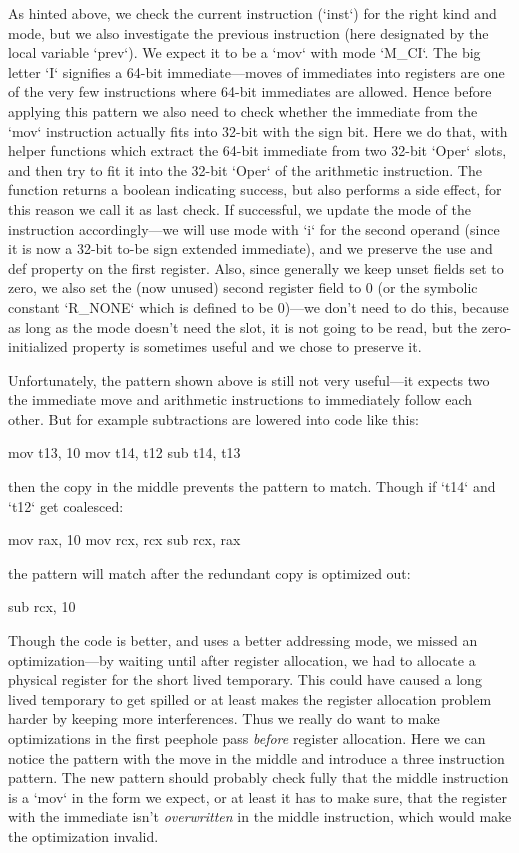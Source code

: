 As hinted above, we check the current instruction (`inst`) for the right kind
and mode, but we also investigate the previous instruction (here designated by
the local variable `prev`). We expect it to be a `mov` with mode `M_CI`.
The big letter `I` signifies a 64-bit
immediate---moves of immediates into registers are one of the very few
instructions where 64-bit immediates are allowed. Hence before applying this pattern
we also need to check whether the immediate from the `mov` instruction actually
fits into 32-bit with the sign bit. Here we do that, with helper functions which
extract the 64-bit immediate from two 32-bit `Oper` slots, and then try to fit
it into the 32-bit `Oper` of the arithmetic instruction. The function
returns a boolean indicating success, but also performs a side effect, for this
reason we call it as last check.
If successful, we update the mode of the instruction accordingly---we will use
mode with `i` for the
second operand (since it is now a 32-bit to-be sign extended immediate), and
we preserve the use and def property on the first register. Also, since
generally we keep unset fields set to zero, we also set the (now unused) second
register field to 0 (or the symbolic constant `R_NONE` which is defined to be
0)---we don't need to do this, because as long as the mode doesn't need the slot,
it is not going to be read, but the zero-initialized property is sometimes
useful and we chose to preserve it.

Unfortunately, the pattern shown above is still not very useful---it expects two
the immediate move and arithmetic instructions to immediately follow each other.
But for example subtractions are lowered into code like this:

\begtt
mov t13, 10
mov t14, t12
sub t14, t13
\endtt

then the copy in the middle prevents the pattern to match. Though if `t14` and `t12`
get coalesced:

\begtt
mov rax, 10
mov rcx, rcx
sub rcx, rax
\endtt

the pattern will match after the redundant copy is optimized out:

\begtt
sub rcx, 10
\endtt

Though the code is better, and uses a better addressing mode, we missed an
optimization---by waiting until after register allocation, we had to allocate
a physical register for the short lived temporary. This could have caused a long
lived temporary to get spilled or at least makes the register allocation problem
harder by keeping more interferences. Thus we really do want to make
optimizations in the first peephole pass {\em before} register allocation. Here
we can notice the pattern with the move in the middle and introduce a three
instruction pattern. The new pattern should probably check fully that the middle
instruction is a `mov` in the form we expect, or at least it has to make sure,
that the register with the immediate isn't {\em overwritten} in the middle
instruction, which would make the optimization invalid.

